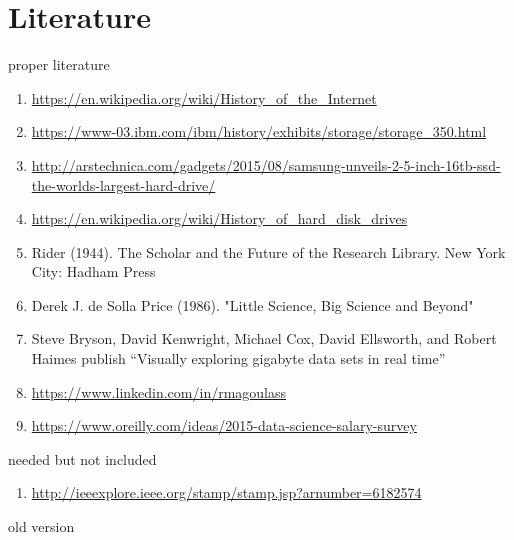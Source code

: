 \documentclass [twoside,
  11pt, a4paper,
  footinclude=true,
  headinclude=true,
  cleardoublepage=empty
]{article}
\begin{document}
\section{Literature}
proper literature
\begin{enumerate}
    \item \url{https://en.wikipedia.org/wiki/History_of_the_Internet} 
    \item \url{https://www-03.ibm.com/ibm/history/exhibits/storage/storage_350.html}
    \item \url{http://arstechnica.com/gadgets/2015/08/samsung-unveils-2-5-inch-16tb-ssd-the-worlds-largest-hard-drive/}
    \item \url{https://en.wikipedia.org/wiki/History_of_hard_disk_drives}
    \item Rider (1944). The Scholar and the Future of the Research Library. New York City: Hadham Press
    \item Derek J. de Solla Price (1986). "Little Science, Big Science and Beyond"
    \item  Steve Bryson, David Kenwright, Michael Cox, David Ellsworth, and Robert Haimes publish “Visually exploring gigabyte data sets in real time”
    \item \url{https://www.linkedin.com/in/rmagoulass}
    \item \url{https://www.oreilly.com/ideas/2015-data-science-salary-survey}
\end{enumerate}
needed but not included
\begin{enumerate}
    \item \url{http://ieeexplore.ieee.org/stamp/stamp.jsp?arnumber=6182574}
\end{enumerate}
old version
\end{document}
